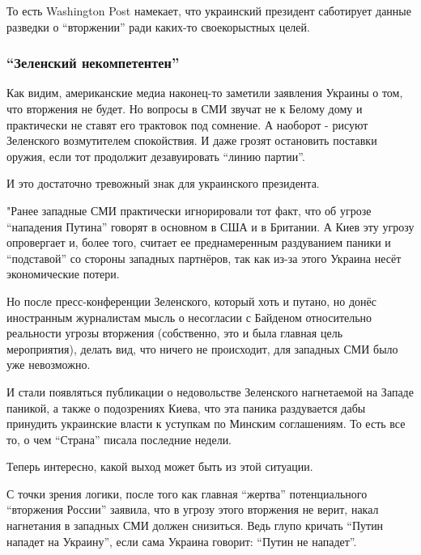 То есть Washington Post намекает, что украинский президент саботирует данные
разведки о \enquote{вторжении} ради каких-то своекорыстных целей. 

\subsubsection{\enquote{Зеленский некомпетентен}}

Как видим, американские медиа наконец-то заметили заявления Украины о том, что
вторжения не будет. Но вопросы в СМИ звучат не к Белому дому и практически не
ставят его трактовок под сомнение. А наоборот - рисуют Зеленского возмутителем
спокойствия. И даже грозят остановить поставки оружия, если тот продолжит
дезавуировать \enquote{линию партии}. 

\raggedcolumns
\begin{multicols}{2} %
\setlength{\parindent}{0pt}



И это достаточно тревожный знак для украинского президента. 

"Ранее западные СМИ практически игнорировали тот факт, что об угрозе
\enquote{нападения Путина} говорят в основном в США и в Британии. А Киев эту
угрозу опровергает и, более того, считает ее преднамеренным раздуванием паники
и \enquote{подставой} со стороны западных партнёров, так как из-за этого
Украина несёт экономические потери.

Но после пресс-конференции Зеленского, который хоть и путано, но донёс
иностранным журналистам мысль о несогласии с Байденом относительно реальности
угрозы вторжения (собственно, это и была главная цель мероприятия), делать вид,
что ничего не происходит, для западных СМИ было уже невозможно.

И стали появляться публикации о недовольстве Зеленского нагнетаемой на Западе
паникой, а также о подозрениях Киева, что эта паника раздувается дабы принудить
украинские власти к уступкам по Минским соглашениям. То есть все то, о чем
\enquote{Страна} писала последние недели.

Теперь интересно, какой выход может быть из этой ситуации.

С точки зрения логики, после того как главная \enquote{жертва} потенциального
\enquote{вторжения России} заявила, что в угрозу этого вторжения не верит,
накал нагнетания в западных СМИ должен снизиться. Ведь глупо кричать
\enquote{Путин нападет на Украину}, если сама Украина говорит: \enquote{Путин
не нападет}.

\end{multicols} %

